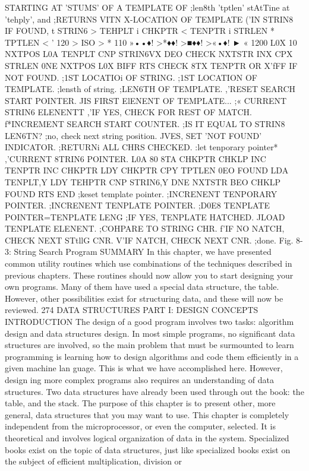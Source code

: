 \documentclass{book}
\begin{document}
{STARTING AT 'STUMS' OF A TEMPLATE OF
;len8th 'tptlen' stAtTine at 'tehply', and
;RETURNS VITN X-LOCATION OF TEMPLATE
('IN STRIN8 IF FOUND,
t
STRIN6 >
TEHPLT i
CHKPTR <
TENPTR i
STRLEN *
TPTLEN <
' 120
> ISO
> * 110
»••♦!
>*♦♦!
>■♦♦!
>«•♦!
► « 1200
L0X 10
NXTPOS L0A TENPLT
CNP STRIN6VX
DEO CHECK
NXTSTR INX
CPX STRLEN
0NE NXTPOS
L0X BIFF
RTS
CHECK 8TX TENPTR
OR X'fFF IF NOT FOUND.
;1ST LOCATIOi OF STRING.
;1ST LOCATION OF TEMPLATE.
;lensth of string.
;LEN6TH OF TEMPLATE.
,'RESET SEARCH START POINTER.
JIS FIRST ElENENT OF TEMPLATE...
;« CURRENT STRIN6 ELENENTT
,'IF YES, CHECK FOR REST OF MATCH.
f*INCREMENT SEARCH START COUNTER.
;IS IT EQUAL TO STRIN8 LEN6TN?
;no, check next string position.
JVES, SET 'NOT FOUND' INDICATOR.
;RETURNi ALL CHRS CHECKED.
:let tenporary pointer*
,'CURRENT 8TRIN6 POINTER.
L0A 80
8TA CHKPTR
CHKLP INC TENPTR
INC CHKPTR
LDY CHKPTR
CPY TPTLEN
0EO FOUND
LDA TENPLT,Y
LDY TEHPTR
CNP STRIN6,Y
DNE NXTSTR
BEO CHKLP
FOUND RTS
END
;keset template pointer.
;INCRENENT TENPORARY POINTER.
;INCRENENT TENPLATE POINTER.
;D0E8 TENPLATE POINTER=TENPLATE LENG
;IF YES, TENPLATE HATCHED.
JLOAD TENPLATE ELENENT.
;COHPARE TO STRING CHR.
f'IF NO NATCH, CHECK NEXT STtllG CNR.
V'IF NATCH, CHECK NEXT CNR.
;done.
Fig. 8-3: String Search Program
SUMMARY
In this chapter, we have presented common utility routines which use
combinations of the techniques described in previous chapters. These
routines should now allow you to start designing your own programs.
Many of them have used a special data structure, the table. However,
other possibilities exist for structuring data, and these will now be
reviewed.
274
DATA STRUCTURES
PART I: DESIGN CONCEPTS
INTRODUCTION
The design of a good program involves two tasks: algorithm
design and data structures design. In most simple programs, no
significant data structures are involved, so the main problem that
must be surmounted to learn programming is learning how to
design algorithms and code them efficiently in a given machine lan
guage. This is what we have accomplished here. However, design
ing more complex programs also requires an understanding of data
structures. Two data structures have already been used through
out the book: the table, and the stack. The purpose of this chapter
is to present other, more general, data structures that you may
want to use. This chapter is completely independent from the
microprocessor, or even the computer, selected. It is theoretical
and involves logical organization of data in the system. Specialized
books exist on the topic of data structures, just like specialized
books exist on the subject of efficient multiplication, division or
}
\end{document}
